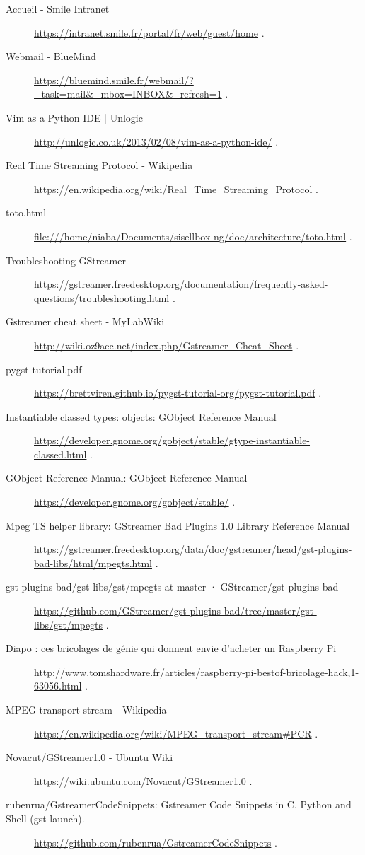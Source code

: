 \begin{description}
\item [Accueil - Smile Intranet] \url{https://intranet.smile.fr/portal/fr/web/guest/home} . 
\item [Webmail - BlueMind] \url{https://bluemind.smile.fr/webmail/?_task=mail&_mbox=INBOX&_refresh=1} . 
\item [Vim as a Python IDE | Unlogic] \url{http://unlogic.co.uk/2013/02/08/vim-as-a-python-ide/} . 
\item [Real Time Streaming Protocol - Wikipedia] \url{https://en.wikipedia.org/wiki/Real_Time_Streaming_Protocol} . 
\item [toto.html] \url{file:///home/niaba/Documents/sisellbox-ng/doc/architecture/toto.html} . 
\item [Troubleshooting GStreamer] \url{https://gstreamer.freedesktop.org/documentation/frequently-asked-questions/troubleshooting.html} . 
\item [Gstreamer cheat sheet - MyLabWiki] \url{http://wiki.oz9aec.net/index.php/Gstreamer_Cheat_Sheet} . 
\item [pygst-tutorial.pdf] \url{https://brettviren.github.io/pygst-tutorial-org/pygst-tutorial.pdf} . 
\item [Instantiable classed types: objects: GObject Reference Manual] \url{https://developer.gnome.org/gobject/stable/gtype-instantiable-classed.html} . 
\item [GObject Reference Manual: GObject Reference Manual] \url{https://developer.gnome.org/gobject/stable/} . 
\item [Mpeg TS helper library: GStreamer Bad Plugins 1.0 Library Reference Manual] \url{https://gstreamer.freedesktop.org/data/doc/gstreamer/head/gst-plugins-bad-libs/html/mpegts.html} . 
\item [gst-plugins-bad/gst-libs/gst/mpegts at master · GStreamer/gst-plugins-bad] \url{https://github.com/GStreamer/gst-plugins-bad/tree/master/gst-libs/gst/mpegts} . 
\item [Diapo : ces bricolages de génie qui donnent envie d'acheter un Raspberry Pi] \url{http://www.tomshardware.fr/articles/raspberry-pi-bestof-bricolage-hack,1-63056.html} . 
\item [MPEG transport stream - Wikipedia] \url{https://en.wikipedia.org/wiki/MPEG_transport_stream#PCR} . 
\item [Novacut/GStreamer1.0 - Ubuntu Wiki] \url{https://wiki.ubuntu.com/Novacut/GStreamer1.0} . 
\item [rubenrua/GstreamerCodeSnippets: Gstreamer Code Snippets in C, Python and Shell (gst-launch).] \url{https://github.com/rubenrua/GstreamerCodeSnippets} . 

\end{description}
